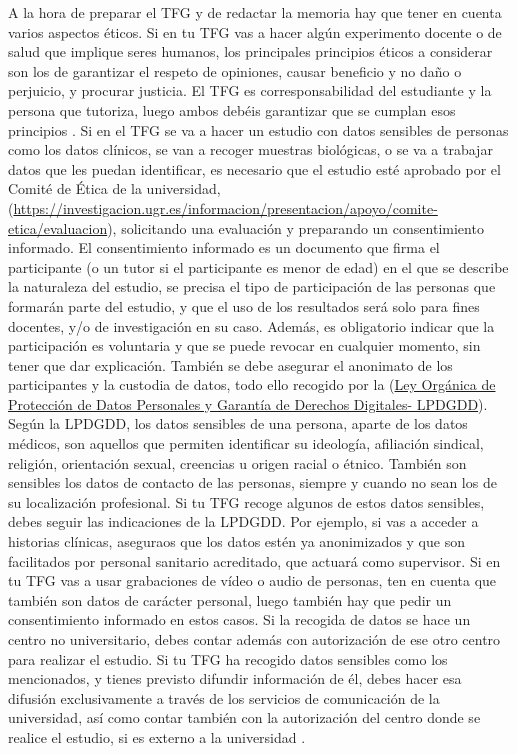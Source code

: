 {A la hora de preparar el TFG y de redactar la memoria hay que tener en cuenta varios aspectos éticos.
Si en tu TFG vas a hacer algún experimento docente o de salud que implique seres humanos, los principales principios éticos a considerar son los de garantizar el respeto de opiniones, causar beneficio y no daño o perjuicio, y procurar justicia. El TFG es corresponsabilidad del estudiante y la persona que tutoriza, luego ambos debéis garantizar que se cumplan esos principios \cite{EticaCantabria}. 
Si en el TFG se va a hacer un estudio con datos sensibles de personas como los datos clínicos, se van a recoger muestras biológicas, o se va a trabajar datos que les puedan identificar, es necesario que el estudio esté aprobado por el Comité de Ética de la universidad, (\url{https://investigacion.ugr.es/informacion/presentacion/apoyo/comite-etica/evaluacion}), solicitando una evaluación y preparando un consentimiento informado. El consentimiento informado es un documento que firma el participante (o un tutor si el participante es menor de edad) en el que se describe la naturaleza del estudio, se precisa el tipo de participación de las personas que formarán parte del estudio, y que el uso de los resultados será solo para fines docentes, y/o de investigación en su caso. Además, es obligatorio indicar que la participación es voluntaria y que se puede revocar en cualquier momento, sin tener que dar explicación. También se debe asegurar el anonimato de los participantes y la custodia de datos, todo ello recogido por la (\href{https://www.boe.es/buscar/act.php?id=BOE-A-2018-16673}{Ley Orgánica de Protección de Datos Personales y Garantía de Derechos Digitales- LPDGDD}). 
Según la LPDGDD, los datos sensibles de una persona, aparte de los datos médicos, son aquellos que permiten identificar su ideología, afiliación sindical, religión, orientación sexual, creencias u origen racial o étnico. También son sensibles los datos de contacto de las personas, siempre y cuando no sean los de su localización profesional. Si tu TFG recoge algunos de estos datos sensibles, debes seguir las indicaciones de la LPDGDD. Por ejemplo, si vas a acceder a historias clínicas, aseguraos que los datos estén ya anonimizados y que son facilitados por personal sanitario acreditado, que actuará como supervisor. Si en tu TFG vas a usar grabaciones de vídeo o audio de personas, ten en cuenta que también son datos de carácter personal, luego también hay que pedir un consentimiento informado en estos casos. Si la recogida de datos se hace un centro no universitario, debes contar además con autorización de ese otro centro para realizar el estudio.
Si tu TFG ha recogido datos sensibles como los mencionados, y tienes previsto difundir información de él, debes hacer esa difusión exclusivamente a través de los servicios de comunicación de la universidad, así como contar también con la autorización del centro donde se realice el estudio, si es externo a la universidad \cite{EticaUGR}.

}
